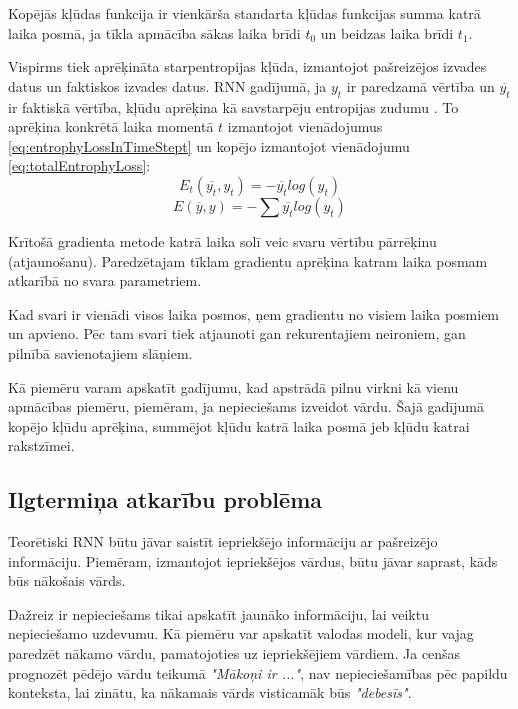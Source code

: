 \documentclass[12pt,paper=A4]{report}
\begin{document}
Kopējās kļūdas funkcija ir vienkārša standarta kļūdas funkcijas summa katrā laika posmā, ja tīkla apmācība sākas laika brīdi $t_0$ un beidzas laika brīdi $t_1$.

Vispirms tiek aprēķināta starpentropijas kļūda, izmantojot pašreizējos izvades datus un faktiskos izvades datus. RNN gadījumā, ja $y_t$ ir paredzamā vērtība un $\overline{y_t}$ ir faktiskā vērtība, kļūdu aprēķina kā savstarpēju entropijas zudumu \cite{bpttRNN}. To aprēķina konkrētā laika momentā $t$ izmantojot vienādojumus \ref{eq:entrophyLossInTimeStept} un kopējo izmantojot vienādojumu \ref{eq:totalEntrophyLoss}:
\begin{equation}
E_t(\overline{y_t}, y_t) = - \overline{y_t} log (y_t)
\label{eq:entrophyLossInTimeStept}
\end{equation}
\begin{equation}
E(\overline{y}, y) = - \sum \overline{y_t} log (y_t)
\label{eq:totalEntrophyLoss}
\end{equation}

Krītošā gradienta metode katrā laika solī veic svaru vērtību pārrēķinu  (atjaunošanu). Paredzētajam tīklam gradientu aprēķina katram laika posmam atkarībā no svara parametriem. 

Kad svari ir vienādi visos laika posmos, ņem gradientu no visiem laika posmiem un apvieno. Pēc tam svari tiek atjaunoti gan rekurentajiem neironiem, gan pilnībā savienotajiem slāņiem.

Kā piemēru varam apskatīt gadījumu, kad apstrādā pilnu virkni kā vienu apmācības piemēru, piemēram, ja nepieciešams izveidot vārdu. Šajā gadījumā kopējo kļūdu aprēķina, summējot kļūdu katrā laika posmā jeb kļūdu katrai rakstzīmei. 	
	
     \subsection{Ilgtermiņa atkarību problēma}
    Teorētiski RNN būtu jāvar saistīt iepriekšējo informāciju ar pašreizējo informāciju. Piemēram, izmantojot iepriekšējos vārdus, būtu jāvar saprast, kāds būs nākošais vārds. 
    
    Dažreiz ir nepieciešams tikai apskatīt jaunāko informāciju, lai veiktu nepieciešamo uzdevumu. Kā piemēru var apskatīt valodas modeli, kur vajag paredzēt nākamo vārdu, pamatojoties uz iepriekšējiem vārdiem. Ja cenšas prognozēt pēdējo vārdu teikumā \textit{"Mākoņi ir ..."}, nav nepieciešamības pēc papildu konteksta, lai zinātu, ka nākamais vārds visticamāk būs \textit{"debesīs"}. 
    
\end{document}
